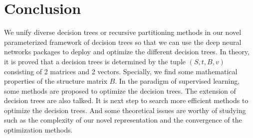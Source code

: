 \documentclass[UTF8]{article}
\begin{document}
\section{Conclusion}
We unify diverse decision trees or recursive partitioning methods in our novel parameterized framework of decision trees so that we can use the deep neural networks packages to deploy and optimize the different decision trees.
In theory, it is proved that a decision trees is determined by the tuple $(S, t, B, v)$ consisting of 2 matrices and 2 vectors.
Specially, we find some mathematical properties of the structure matrix $B$.
In the paradigm of supervised learning, some methods are proposed to optimize the decision trees.
The extension of decision trees are also talked.
It is next step to search more efficient methods to optimize the decision trees.
And some theoretical issues are worthy of studying such as the complexity of our novel representation and the convergence of the optimization methods. 



\end{document}
